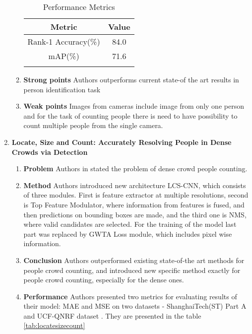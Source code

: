 \begin{enumerate}
\begin{enumerate}
        \begin{center}
            \begin{longtable}{cc}
            \label{tab:monitoringflow} \\
            \hline
            Metric & Value\\
            \hline
            Rank-1 Accuracy(\%) & 84.0 \\
            \hline
            mAP(\%) & 71.6 \\
            \hline
            \caption[Metrics table for Monitoring Pedestrian Flow]{Performance Metrics} 
            \end{longtable}
            
        \end{center}
        
        \item \textbf{Strong points}
        Authors outperforms current state-of the art results in person identification task 
        \item \textbf{Weak points}
        Images from cameras include image from only one person and for the task of counting people there is need to have possibility to count multiple people from the single camera.
    \end{enumerate}
    \item \textbf{Locate, Size and Count: Accurately Resolving People in Dense Crowds via Detection}
    \begin{enumerate}
        \item \textbf{Problem}
        Authors in \cite{sam2019locate} stated the problem of dense crowd people counting.
        \item \textbf{Method}
        Authors introduced new architecture LCS-CNN, which consists of three modules. First is feature extractor at multiple resolutions, second is Top Feature Modulator, where information from features is fused, and then predictions on bounding boxes are made, and the third one is NMS, where valid candidates are selected. For the training of the model last part was replaced by GWTA Loss module, which includes pixel wise information.   
        \item \textbf{Conclusion}
        Authors outperformed existing state-of-the art methods for people crowd counting, and introduced new specific method exactly for people crowd counting, especially for the dense ones.
        \item \textbf{Performance}
        Authors presented two metrics for evaluating results of their model: MAE and MSE on two datasets - ShanghaiTech(ST) Part A \cite{7780439} and UCF-QNRF dataset \cite{idrees2018composition}. They are presented in the table \ref{tab:locatesizecount}
        \\ \\
        

\end{enumerate}
\end{enumerate}

